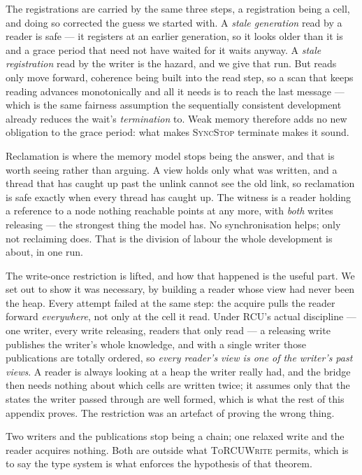 The registrations are carried by the same three steps, a registration being a
cell, and doing so corrected the guess we started with.  A \emph{stale
generation} read by a reader is safe --- it registers at an earlier generation,
so it looks older than it is and a grace period that need not have waited for
it waits anyway.  A \emph{stale registration} read by the writer is the hazard,
and we give that run.  But reads only move forward, coherence being built into
the read step, so a scan that keeps reading advances monotonically and all it
needs is to reach the last message --- which is the same fairness assumption
the sequentially consistent development already reduces the wait's
\emph{termination} to.  Weak memory therefore adds no new obligation to the
grace period: what makes \textsc{SyncStop} terminate makes it sound.

Reclamation is where the memory model stops being the answer, and that is worth
seeing rather than arguing.  A view holds only what was written, and a thread
that has caught up past the unlink cannot see the old link, so reclamation is
safe exactly when every thread has caught up.  The witness is a reader holding
a reference to a node nothing reachable points at any more, with \emph{both}
writes releasing --- the strongest thing the model has.  No synchronisation
helps; only not reclaiming does.  That is the division of labour the whole
development is about, in one run.

The write-once restriction is lifted, and how that happened is the useful part.
We set out to show it was necessary, by building a reader whose view had never
been the heap.  Every attempt failed at the same step: the acquire pulls the
reader forward \emph{everywhere}, not only at the cell it read.  Under RCU's
actual discipline --- one writer, every write releasing, readers that only read
--- a releasing write publishes the writer's whole knowledge, and with a single
writer those publications are totally ordered, so \emph{every reader's view is
one of the writer's past views}.  A reader is always looking at a heap the
writer really had, and the bridge then needs nothing about which cells are
written twice; it assumes only that the states the writer passed through are
well formed, which is what the rest of this appendix proves.  The restriction
was an artefact of proving the wrong thing.

Two writers and the publications stop being a chain; one relaxed write and the
reader acquires nothing.  Both are outside what \textsc{ToRCUWrite} permits,
which is to say the type system is what enforces the hypothesis of that
theorem.

